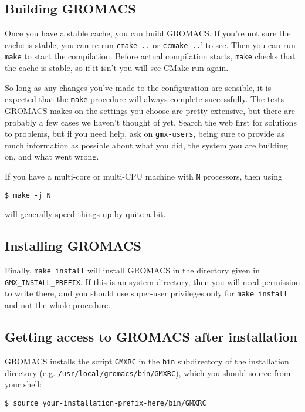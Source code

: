 \documentclass{article}[12pt,a4paper,twoside]
\newcommand{\gromacs}{GROMACS}
\newcommand{\cmake}{CMake}
\begin{document}
\subsection{Building \gromacs{}}

Once you have a stable cache, you can build \gromacs{}. If you're not
sure the cache is stable, you can re-run \verb+cmake ..+ or
\verb+ccmake ..+' to see. Then you can run \texttt{make} to start the
compilation. Before actual compilation starts, \texttt{make} checks
that the cache is stable, so if it isn't you will see \cmake{} run
again.

So long as any changes you've made to the configuration are sensible,
it is expected that the \texttt{make} procedure will always complete
successfully. The tests \gromacs{} makes on the settings you choose
are pretty extensive, but there are probably a few cases we haven't
thought of yet. Search the web first for solutions to problems,
but if you need help, ask on \texttt{gmx-users}, being sure to provide
as much information as possible about what you did, the system you are
building on, and what went wrong.

If you have a multi-core or multi-CPU machine with \texttt{N}
processors, then using
\begin{verbatim}
$ make -j N
\end{verbatim}
will generally speed things up by quite a bit.

\subsection{Installing \gromacs{}}

Finally, \texttt{make install} will install \gromacs{} in the
directory given in \texttt{GMX\_INSTALL\_PREFIX}. If this is an system
directory, then you will need permission to write there, and you
should use super-user privileges only for \texttt{make install} and
not the whole procedure.

\subsection{Getting access to \gromacs{} after installation}

\gromacs{} installs the script \texttt{GMXRC} in the \texttt{bin}
subdirectory of the installation directory
(e.g. \texttt{/usr/local/gromacs/bin/GMXRC}), which you should source
from your shell:
\begin{verbatim}
$ source your-installation-prefix-here/bin/GMXRC
\end{verbatim}
\end{document}
